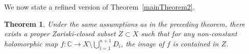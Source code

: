 \documentclass[10pt]{amsart}
\numberwithin{equation}{section}
\theoremstyle{plain}
\newtheorem{theorem}{Theorem}[section]
\newtheorem{lemma}[theorem]{Lemma}
\theoremstyle{definition}
\DeclareMathOperator{\vol}{vol}
\begin{document}
 

We now state a refined version of Theorem~\ref{mainTheorem2}.
\begin{theorem}\label{quasi-hyperbolic}
    Under the same assumptions as in the preceding theorem, there exists a proper Zariski-closed subset $Z\subset X$ such that  for any non-constant holomorphic map $f:\mathbb{C}\to X\setminus{\bigcup_{i=1}^{n+1} } D_i$, the image of $f$ is contained in $Z$.
    \end{theorem}
 
\end{document}

